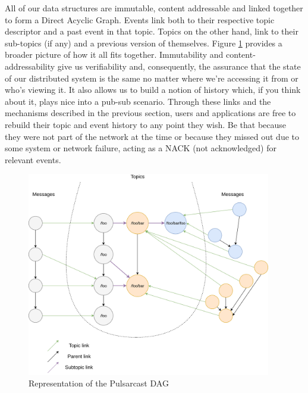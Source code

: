 All of our data structures are immutable, content addressable and linked
together to form a Direct Acyclic Graph. Events link both to their respective
topic descriptor and a past event in that topic. Topics on the other hand, link
to their sub-topics (if any) and a previous version of themselves. Figure
\ref{fig:pulsarcast-dag} provides a broader picture of how it all fits
together. Immutability and content-addressability give us verifiability and,
consequently, the assurance that the state of our distributed system is the
same no matter where we're accessing it from or who's viewing it. It also
allows us to build a notion of history which, if you think about it, plays nice
into a pub-sub scenario. Through these links and the mechanisms described in
the previous section, users and applications are free to rebuild their topic
and event history to any point they wish. Be that because they were not part of
the network at the time or because they missed out due to some system or
network failure, acting as a NACK (not acknowledged) for relevant events.

\begin{figure}[hb!]
  \centering
  \includegraphics[width=0.95\textwidth]{img/pulsarcast-dag.png}
  \caption{Representation of the Pulsarcast DAG}
  \label{fig:pulsarcast-dag}
\end{figure}


